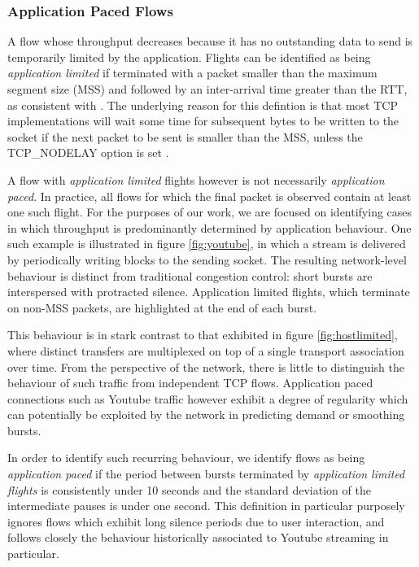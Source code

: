 \subsubsection{Application Paced Flows}
\label{sssec:app}

A flow whose throughput decreases because it has no outstanding data to send is temporarily limited by the application. 
Flights can be identified as being \emph{application limited} if terminated with a packet smaller than the maximum segment size (MSS) and followed by an inter-arrival time greater than the RTT, as consistent with \cite{Zhang:2002p85}. The underlying reason for this defintion is that most TCP implementations will wait some time for subsequent bytes to be written to the socket if the next packet to be sent is smaller than the MSS, unless the TCP\_NODELAY option is set \cite{nagle1984rfc}.

A flow with \emph{application limited} flights however is not necessarily \emph{application paced}. In practice, all flows for which the final packet is observed contain at least one such flight.
For the purposes of our work, we are focused on identifying cases in which throughput is predominantly determined by application behaviour.
One such example is illustrated in figure \ref{fig:youtube}, in which a stream is delivered by periodically writing blocks to the sending socket.
The resulting network-level behaviour is distinct from traditional congestion control: short bursts are interspersed with protracted silence.
Application limited flights, which terminate on non-MSS packets, are highlighted at the end of each burst.

This behaviour is in stark contrast to that exhibited in figure \ref{fig:hostlimited}, where distinct transfers are multiplexed on top of a single transport association over time.
From the perspective of the network, there is little to distinguish the behaviour of such traffic from independent TCP flows.
Application paced connections such as Youtube traffic however exhibit a degree of regularity which can potentially be exploited by the network in predicting demand or smoothing bursts.

In order to identify such recurring behaviour, we identify flows as being \emph{application paced} if the period between bursts terminated by \emph{application limited flights} is consistently under 10 seconds and the standard deviation of the intermediate pauses is under one second.
This definition in particular purposely ignores flows which exhibit long silence periods due to user interaction, and follows closely the behaviour historically associated to Youtube streaming in particular.

